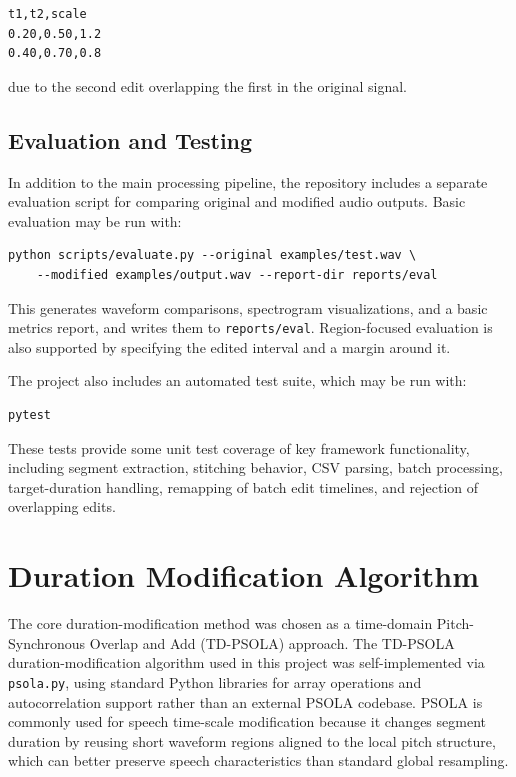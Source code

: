 \documentclass{article}
\begin{document}
\begin{verbatim}
t1,t2,scale
0.20,0.50,1.2
0.40,0.70,0.8
\end{verbatim}

due to the second edit overlapping the first in the original signal.

\subsection{Evaluation and Testing}

In addition to the main processing pipeline, the repository includes a separate evaluation script for comparing original and modified audio outputs. Basic evaluation may be run with:

\begin{verbatim}
python scripts/evaluate.py --original examples/test.wav \
    --modified examples/output.wav --report-dir reports/eval
\end{verbatim}

This generates waveform comparisons, spectrogram visualizations, and a basic metrics report, and writes them to \texttt{reports/eval}. Region-focused evaluation is also supported by specifying the edited interval and a margin around it.

The project also includes an automated test suite, which may be run with:

\begin{verbatim}
pytest
\end{verbatim}

These tests provide some unit test coverage of key framework functionality, including segment extraction, stitching behavior, CSV parsing, batch processing, target-duration handling, remapping of batch edit timelines, and rejection of overlapping edits.

\section{Duration Modification Algorithm}

The core duration-modification method was chosen as a time-domain Pitch-Synchronous Overlap and Add (TD-PSOLA) approach. The TD-PSOLA duration-modification algorithm used in this project was self-implemented via \texttt{psola.py}, using standard Python libraries for array operations and autocorrelation support rather than an external PSOLA codebase. PSOLA is commonly used for speech time-scale modification because it changes segment duration by reusing short waveform regions aligned to the local pitch structure, which can better preserve speech characteristics than standard global resampling.
\end{document}

